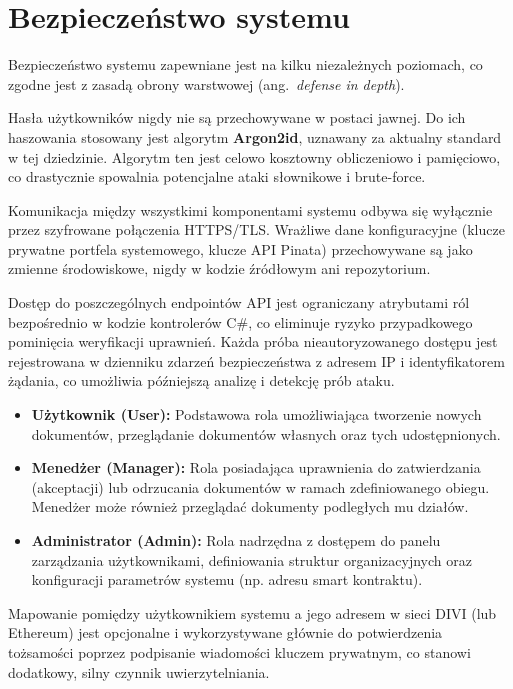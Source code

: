 \documentclass[12pt,a4paper,twoside]{report}
\begin{document}
\section{Bezpieczeństwo systemu}

Bezpieczeństwo systemu zapewniane jest na kilku niezależnych poziomach, co zgodne jest
z zasadą obrony warstwowej (ang.~\textit{defense in depth}).

Hasła użytkowników nigdy nie są przechowywane w postaci jawnej. Do ich haszowania
stosowany jest algorytm \textbf{Argon2id}, uznawany za aktualny standard w tej dziedzinie.
Algorytm ten jest celowo kosztowny obliczeniowo i pamięciowo, co drastycznie spowalnia
potencjalne ataki słownikowe i brute-force.

Komunikacja między wszystkimi komponentami systemu odbywa się wyłącznie przez szyfrowane
połączenia HTTPS/TLS. Wrażliwe dane konfiguracyjne (klucze prywatne portfela systemowego,
klucze API Pinata) przechowywane są jako zmienne środowiskowe, nigdy w kodzie źródłowym
ani repozytorium.

\newpage
Dostęp do poszczególnych endpointów API jest ograniczany atrybutami ról bezpośrednio
w kodzie kontrolerów C\#, co eliminuje ryzyko przypadkowego pominięcia weryfikacji
uprawnień. Każda próba nieautoryzowanego dostępu jest rejestrowana w dzienniku zdarzeń
bezpieczeństwa z adresem IP i identyfikatorem żądania, co umożliwia późniejszą analizę
i detekcję prób ataku.

\begin{itemize}
    \item \textbf{Użytkownik (User):} Podstawowa rola umożliwiająca tworzenie nowych dokumentów, przeglądanie dokumentów własnych oraz tych udostępnionych.
    \item \textbf{Menedżer (Manager):} Rola posiadająca uprawnienia do zatwierdzania (akceptacji) lub odrzucania dokumentów w ramach zdefiniowanego obiegu. Menedżer może również przeglądać dokumenty podległych mu działów.
    \item \textbf{Administrator (Admin):} Rola nadrzędna z dostępem do panelu zarządzania użytkownikami, definiowania struktur organizacyjnych oraz konfiguracji parametrów systemu (np. adresu smart kontraktu).
\end{itemize}
Mapowanie pomiędzy użytkownikiem systemu a jego adresem w sieci DIVI (lub Ethereum) jest opcjonalne i wykorzystywane głównie do potwierdzenia tożsamości poprzez podpisanie wiadomości kluczem prywatnym, co stanowi dodatkowy, silny czynnik uwierzytelniania.
\end{document}

